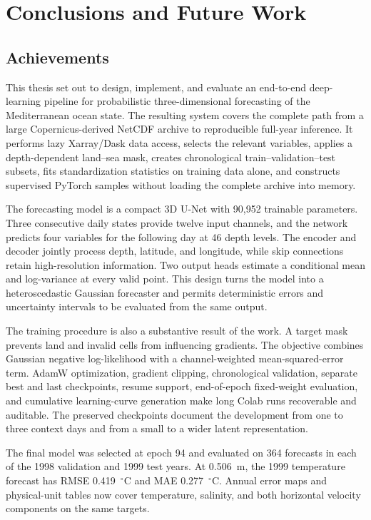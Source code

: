 \chapter{Conclusions and Future Work}
\label{chap:conclusions}

\section{Achievements}

This thesis set out to design, implement, and evaluate an end-to-end deep-learning pipeline for probabilistic three-dimensional forecasting of the Mediterranean ocean state. The resulting system covers the complete path from a large Copernicus-derived NetCDF archive to reproducible full-year inference. It performs lazy Xarray/Dask data access, selects the relevant variables, applies a depth-dependent land--sea mask, creates chronological train--validation--test subsets, fits standardization statistics on training data alone, and constructs supervised PyTorch samples without loading the complete archive into memory.

The forecasting model is a compact 3D U-Net with 90,952 trainable parameters. Three consecutive daily states provide twelve input channels, and the network predicts four variables for the following day at 46 depth levels. The encoder and decoder jointly process depth, latitude, and longitude, while skip connections retain high-resolution information. Two output heads estimate a conditional mean and log-variance at every valid point. This design turns the model into a heteroscedastic Gaussian forecaster and permits deterministic errors and uncertainty intervals to be evaluated from the same output.

The training procedure is also a substantive result of the work. A target mask prevents land and invalid cells from influencing gradients. The objective combines Gaussian negative log-likelihood with a channel-weighted mean-squared-error term. AdamW optimization, gradient clipping, chronological validation, separate best and last checkpoints, resume support, end-of-epoch fixed-weight evaluation, and cumulative learning-curve generation make long Colab runs recoverable and auditable. The preserved checkpoints document the development from one to three context days and from a small to a wider latent representation.

The final model was selected at epoch 94 and evaluated on 364 forecasts in each of the 1998 validation and 1999 test years. At 0.506~m, the 1999 temperature forecast has RMSE 0.419~$^{\circ}$C and MAE 0.277~$^{\circ}$C. Annual error maps and physical-unit tables now cover temperature, salinity, and both horizontal velocity components on the same targets.

